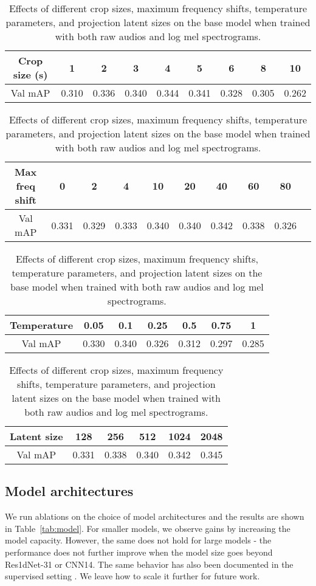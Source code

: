 \documentclass{article}
\begin{document}
\begin{table}[t]
  \caption{Effects of different crop sizes, maximum frequency shifts, temperature parameters, and projection latent sizes on the base model when trained with both raw audios and log mel spectrograms.}
  \label{tab:crop}
  \centering
  \begin{tabular}{ccccccccc}
    \toprule
    Crop size (s) & 1 & 2 & 3 & 4 & 5 & 6 & 8 & 10 \\
    \midrule
    Val mAP & 0.310 & 0.336 & 0.340 & 0.344 & 0.341 & 0.328 & 0.305 & 0.262    \\
    \bottomrule
  \end{tabular}
  \begin{tabular}{cccccccccc}
    \toprule
    Max freq shift & 0 & 2 & 4  & 10 & 20 & 40 & 60 & 80 \\
    \midrule
    Val mAP & 0.331 & 0.329 & 0.333 & 0.340 & 0.340 & 0.342  & 0.338 & 0.326    \\
    \bottomrule
  \end{tabular}
  \begin{tabular}{ccccccc}
    \toprule
    Temperature & 0.05 & 0.1 & 0.25 & 0.5 & 0.75 & 1 \\
    \midrule
    Val mAP & 0.330 & 0.340 & 0.326 & 0.312 & 0.297 & 0.285    \\
    \bottomrule
  \end{tabular}
  \begin{tabular}{cccccc}
    \toprule
    Latent size & 128 & 256 & 512 & 1024 & 2048 \\
    \midrule
    Val mAP & 0.331 & 0.338 & 0.340 & 0.342 & 0.345    \\
    \bottomrule
  \end{tabular}
\end{table}









\subsection{Model architectures}

We run ablations on the choice of model architectures and the results are shown in Table~\ref{tab:model}. For smaller models, we observe gains by increasing the model capacity. However, the same does not hold for large models - the performance does not further improve when the model size goes beyond Res1dNet-31 or CNN14. The same behavior has also been documented in the supervised setting \cite{kong2020panns}. We leave how to scale it further for future work.
\end{document}
